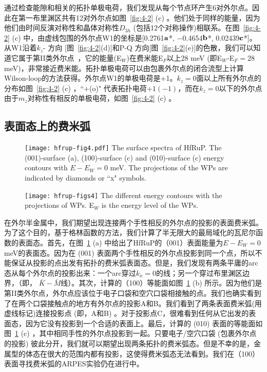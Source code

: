通过检查能隙和相关的拓扑单极电荷，我们发现从每个节点环产生6对外尔点。因此在第一布里渊区共有12对外尔点如图~\ref{fig:4-2} (c) 。他们处于同样的能量，因为他们由时间反演对称性和晶体对称性$D_{3h}$ (包括12个对称操作)相联系。在图~\ref{fig:4-2} (c) 中，由虚线包围的外尔点W1的坐标是[0.2761$\bf a$*, $-$0.4654$\bf b$*, 0.02439$\bf c$*]。 从W1沿着$k_z$- 方向 [图~\ref{fig:4-2}(d)]和P-Q 方向[图~\ref{fig:4-2}(e)]的色散，我们可以知道它属于第II类外尔点~\citep{xu2015}，它的能量(E$_W$)在费米能E$_F$以上28 meV (即E$_W$-E$_F= 28$ meV)，非常接近费米能。拓扑单极电荷可以由包裹外尔点的闭合流型上计算Wilson-loop的方法获得。外尔点W1的单极电荷是+1。$k_z = 0$面以上所有外尔点的分布如图~\ref{fig:4-2} (c) ，``+(o)" 代表拓扑电荷$+1(-1)$，而在$k_z = 0$以下的外尔点由于$m_z$对称性有相反的单极电荷，如图~\ref{fig:4-2} (c) 。
    
    
\subsection{表面态上的费米弧}
\begin{figure}[!htbp]
    \centering
    \texttt{[image: hfrup-fig4.pdf]}
    {
    The surface spectra of HfRuP. The (001)-surface (a), (100)-surface (c) and (010)-surface (c) energy contours with $E-E_W=0$ meV.
    The projections of the WPs are indicated by diamonds or ``x" symbols. ~\citep{qian2019npj}
    }
    \label{fig:4-4}
\end{figure}    

\begin{figure}[!h]
    \centering
    \texttt{[image: hfrup-figs4]}
    {
    The different energy contours with the projections of WPs.
    E$_W$ is the energy level of the WPs. ~\citep{qian2019npj}
    }\label{hfrup-fig:s4}
\end{figure}
  
在外尔半金属中，我们期望出现连接两个手性相反的外尔点的投影的表面费米弧。为了这个目的，基于格林函数的方法\citep{Sancho_1985}，我们计算了半无限大的最局域化的瓦尼尔函数的表面态。首先，在图~\ref{fig:4-4} (a) 中给出了HfRuP的（001）表面能量为$E-E_W=0$ meV的表面态。因为在 (001) 表面两个手性相反的外尔点投影到同一个点，所以不能保证从投影的点出发有拓扑的费米弧表面态。但是，我们发现有两条平庸的arc态从每个外尔点的投影出来：一个arc穿过$k_x = 0$的线；另一个穿过布里渊区边界，（即， $\bar K- \bar M$线）。其次，计算的（100）等能面如图~\ref{fig:4-4} (b) 所示。因为他们是第II类外尔点，外尔点应该位于电子口袋和空穴口袋相接触的点。我们也确实看到了在两个口袋接触点的地方有外尔点的投影A和B。我们看到了两条表面费米弧(用虚线标记)连接投影点 (即，A和B) 。对于投影点C，很难看到任何从它出发的表面态，因为它没有投影到一个合适的表面上。最后，计算的 (010) 表面的等能面如图~\ref{fig:4-4} (c) ，其中相同手性的外尔点投影到一起。只要电子/空穴口袋 (包裹外尔点的投影) 彼此分开，我们就可以期望出现两条拓扑的费米弧态。但是不幸的是，金属型的体态在很大的范围内都有投影，这使得费米弧态无法看到。我们在（100）表面寻找费米弧的ARPES实验仍在进行中。
  
